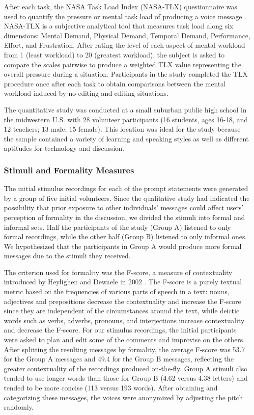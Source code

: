 After each task, the NASA Task Load Index (NASA-TLX) questionnaire was used to quantify the pressure or mental task load of producing a voice message \cite{nasatlx}. 
NASA-TLX is a subjective analytical tool that measures task load along six dimensions: Mental Demand, Physical Demand, Temporal Demand, Performance, Effort, and Frustration. 
After rating the level of each aspect of mental workload from 1 (least workload) to 20 (greatest workload), the subject is asked to compare the scales pairwise to produce a weighted TLX value representing the overall pressure during a situation. 
Participants in the study completed the TLX procedure once after each task to obtain comparisons between the mental workload induced by no-editing and editing situations.

The quantitative study was conducted at a small suburban public high school in the midwestern U.S. with 28 volunteer participants (16 students, ages 16-18, and 12 teachers; 13 male, 15 female).
This location was ideal for the study because the sample contained a variety of learning and speaking styles as well as different aptitudes for technology and discussion. 

\subsubsection{Stimuli and Formality Measures}\label{stimuli}

The initial stimulus recordings for each of the prompt statements were generated by a group of five initial volunteers. 
Since the qualitative study had indicated the possibility that prior exposure to other individuals' messages could affect users' perception of formality in the discussion, we divided the stimuli into formal and informal sets. 
Half the participants of the study (Group A) listened to only formal recordings, while the other half (Group B) listened to only informal ones.
We hypothesized that the participants in Group A would produce more formal messages due to the stimuli they received.

The criterion used for formality was the F-score, a measure of contextuality introduced by Heylighen and Dewaele in 2002 \cite{heylighen}.
The F-score is a purely textual metric based on the frequencies of various parts of speech in a text: nouns, adjectives and prepositions decrease the contextuality and increase the F-score since they are independent of the circumstances around the text, while deictic words such as verbs, adverbs, pronouns, and interjections increase contextuality and decrease the F-score. 
For our stimulus recordings, the initial participants were asked to plan and edit some of the comments and improvise on the others.
After splitting the resulting messages by formality, the average F-score was 53.7 for the Group A messages and 49.4 for the Group B messages, reflecting the greater contextuality of the recordings produced on-the-fly.
Group A stimuli also tended to use longer words than those for Group B (4.62 versus 4.38 letters) and tended to be more concise (113 versus 193 words).
After obtaining and categorizing these messages, the voices were anonymized by adjusting the pitch randomly.

